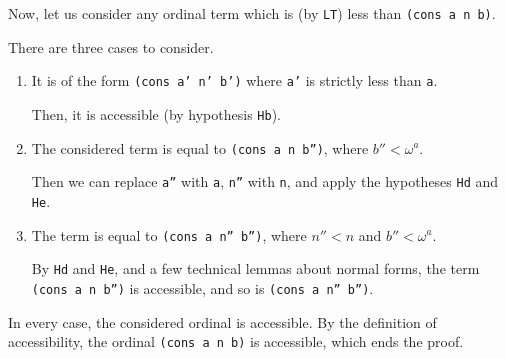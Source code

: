 


Now, let us consider any ordinal term which is (by \texttt{LT}) less than \texttt{(cons a n b)}.

There are three cases to consider.
\begin{enumerate}
\item It is of the form \texttt{(cons a' n' b')} where \texttt{a'} is strictly less than \texttt{a}.
  
  Then, it is accessible (by hypothesis \texttt{Hb}).
  
  \item The considered term  is equal to
    \texttt{(cons a n b'')}, where $b''<\omega^a$. 
    
    Then we can replace \texttt{a''} with \texttt{a}, \texttt{n''} with \texttt{n}, and apply the hypotheses \texttt{Hd} and \texttt{He}.
    
\item
  The term is equal to
  \texttt{(cons a n'' b'')}, where $n''<n$ and $b''<\omega^a$.

  
  

  By \texttt{Hd} and \texttt{He}, and a few technical lemmas about normal forms,   the term  \texttt{(cons a n b'')} is accessible, and so is \texttt{(cons a n'' b'')}.

 
\end{enumerate}

In every case, the considered ordinal is accessible. By the definition of accessibility, the ordinal \texttt{(cons a n b)} is accessible, which ends the proof. 
